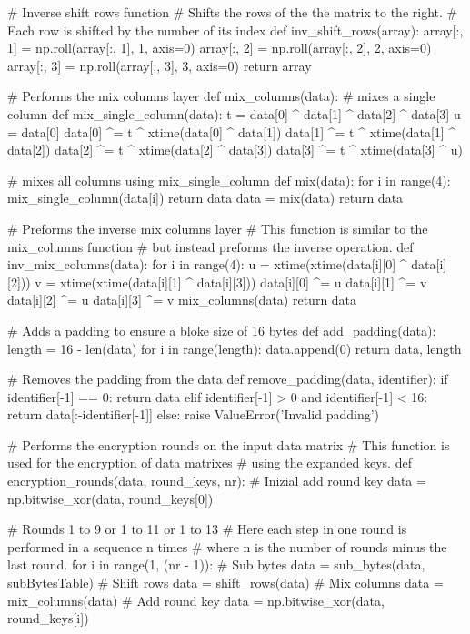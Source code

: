 \begin{python}
# Inverse shift rows function
# Shifts the rows of the the matrix to the right.
# Each row is shifted by the number of its index
def inv_shift_rows(array):
    array[:, 1] = np.roll(array[:, 1], 1, axis=0)
    array[:, 2] = np.roll(array[:, 2], 2, axis=0)
    array[:, 3] = np.roll(array[:, 3], 3, axis=0)
    return array


# Performs the mix columns layer
def mix_columns(data):
    # mixes a single column
    def mix_single_column(data):
        t = data[0] ^ data[1] ^ data[2] ^ data[3]
        u = data[0]
        data[0] ^= t ^ xtime(data[0] ^ data[1])
        data[1] ^= t ^ xtime(data[1] ^ data[2])
        data[2] ^= t ^ xtime(data[2] ^ data[3])
        data[3] ^= t ^ xtime(data[3] ^ u)

    # mixes all columns using mix_single_column
    def mix(data):
        for i in range(4):
            mix_single_column(data[i])
        return data
    data = mix(data)
    return data


# Preforms the inverse mix columns layer
# This function is similar to the mix_columns function
# but instead preforms the inverse operation.
def inv_mix_columns(data):
    for i in range(4):
        u = xtime(xtime(data[i][0] ^ data[i][2]))
        v = xtime(xtime(data[i][1] ^ data[i][3]))
        data[i][0] ^= u
        data[i][1] ^= v
        data[i][2] ^= u
        data[i][3] ^= v
    mix_columns(data)
    return data


# Adds a padding to ensure a bloke size of 16 bytes
def add_padding(data):
    length = 16 - len(data)
    for i in range(length):
        data.append(0)
    return data, length


# Removes the padding from the data
def remove_padding(data, identifier):
    if identifier[-1] == 0:
        return data
    elif identifier[-1] > 0 and identifier[-1] < 16:
        return data[:-identifier[-1]]
    else:
        raise ValueError('Invalid padding')


# Performs the encryption rounds on the input data matrix
# This function is used for the encryption of data matrixes
# using the expanded keys.
def encryption_rounds(data, round_keys, nr):
    # Inizial add round key
    data = np.bitwise_xor(data, round_keys[0])

    # Rounds 1 to 9 or 1 to 11 or 1 to 13
    # Here each step in one round is performed in a sequence n times
    # where n is the number of rounds minus the last round.
    for i in range(1, (nr - 1)):
        # Sub bytes
        data = sub_bytes(data, subBytesTable)
        # Shift rows
        data = shift_rows(data)
        # Mix columns
        data = mix_columns(data)
        # Add round key
        data = np.bitwise_xor(data, round_keys[i])


\end{python}
